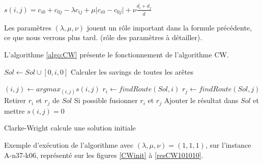 \documentclass[a4paper,11pt]{article}%
\begin{document}
\begin{center}
$s(i,j) = c_{i0} + c_{0j} - \lambda c_{ij} + \mu \vert c_{i0} - c_{0j} \vert + \nu \frac{d_i + d_j}{\overline{d}}$
\end{center}

Les paramètres $(\lambda, \mu, \nu)$ jouent un rôle important dans la formule précédente, ce que nous verrons plus tard. (rôle des paramètres à détailler). 

L'algorithme \ref{algo:CW} présente le fonctionnement de l'algorithme CW.

\begin{algorithm}
\DontPrintSemicolon %

 {
	$Sol \gets Sol \cup [0,i,0]$\;
}
Calculer les savings de toutes les arêtes\;

 {
	$(i,j) \gets argmax_{(i,j)} s(i,j)$\;
	$r_i \gets findRoute(Sol,i)$\;
	$r_j \gets findRoute(Sol,j)$\;
	 {
		Retirer $r_i$ et $r_j$ de $Sol$\;
		Si possible fusionner $r_i$ et $r_j$\;
		Ajouter le résultat dans $Sol$ et mettre $s(i,j) = 0$\;
	}
}

\;
\caption{{\sc Clarke-Wright} calcule une solution initiale}
\label{algo:CW}
\end{algorithm}

Exemple d'exécution de l'algorithme avec $(\lambda, \mu, \nu) = (1,1,1)$, sur l'instance A-n37-k06, représenté sur les figures \ref{CWinit} à \ref{resCW101010}.
\end{document}
